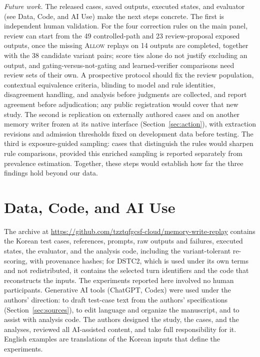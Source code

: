 \documentclass[acmsmall,review]{acmart}
\newcommand{\allow}{\textsc{Allow}}
\begin{document}
\emph{Future work.} The released cases, saved outputs, executed states, and evaluator (see Data, Code, and AI Use) make the next steps concrete. The first is independent human validation. For the four correction rules on the main panel, review can start from the 49 controlled-path and 23 review-proposal exposed outputs, once the missing \allow{} replays on 14 outputs are completed, together with the 38 candidate variant pairs; score ties alone do not justify excluding an output, and gating-versus-not-gating and learned-verifier comparisons need review sets of their own. A prospective protocol should fix the review population, contextual equivalence criteria, blinding to model and rule identities, disagreement handling, and analysis before judgments are collected, and report agreement before adjudication; any public registration would cover that new study. The second is replication on externally authored cases and on another memory writer frozen at its native interface (Section~\ref{sec:action}), with extraction revisions and admission thresholds fixed on development data before testing. The third is exposure-guided sampling: cases that distinguish the rules would sharpen rule comparisons, provided this enriched sampling is reported separately from prevalence estimation. Together, these steps would establish how far the three findings hold beyond our data.

\section*{Data, Code, and AI Use}
The archive at \url{https://github.com/tzztqfgcsf-cloud/memory-write-replay} contains the Korean test cases, references, prompts, raw outputs and failures, executed states, the evaluator, and the analysis code, including the variant-tolerant re-scoring, with provenance hashes; for DSTC2, which is used under its own terms and not redistributed, it contains the selected turn identifiers and the code that reconstructs the inputs. The experiments reported here involved no human participants. Generative AI tools (ChatGPT, Codex) were used under the authors' direction: to draft test-case text from the authors' specifications (Section~\ref{sec:sources}), to edit language and organize the manuscript, and to assist with analysis code. The authors designed the study, the cases, and the analyses, reviewed all AI-assisted content, and take full responsibility for it. English examples are translations of the Korean inputs that define the experiments.

\FloatBarrier

\nocite{cite1,cite2,cite3,cite4,cite5,cite6,cite7,cite8,cite9,cite10,cite11,cite12,cite13,cite14,cite15,cite16,cite17,cite18,cite19,cite20,cite21,cite22,cite23,cite24,cite25,cite26,cite27,cite28,cite29,cite30,cite31,cite32,cite33,cite34,cite35,cite36,cite37,cite38,cite39,cite40,cite41,cite42,cite43,cite44,cite45,cite46,cite47,cite48,cite49,cite50,cite51,cite52,cite53,cite54,cite55,cite56,cite57,cite58}

\end{document}
